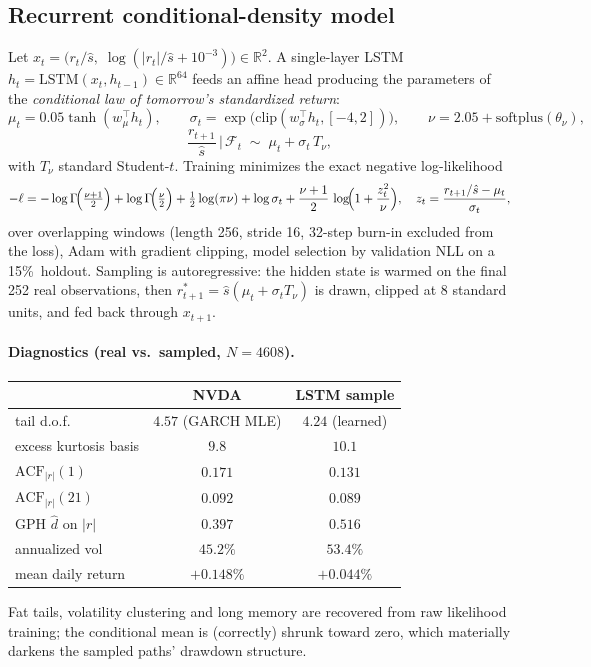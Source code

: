 \documentclass[11pt,a4paper]{article}
\newcommand{\R}{\mathbb{R}}
\begin{document}
\subsection{Recurrent conditional-density model}\label{sec:rnn}

Let $x_t = \bigl(r_t/\hat s,\; \log(|r_t|/\hat s + 10^{-3})\bigr)\in\R^2$. A
single-layer LSTM $h_t = \mathrm{LSTM}(x_t, h_{t-1})\in\R^{64}$ feeds an affine
head producing the parameters of the \emph{conditional law of tomorrow's
standardized return}:
\begin{equation}
\mu_t = 0.05\tanh(w_\mu^\top h_t),\qquad
\sigma_t = \exp\bigl(\mathrm{clip}(w_\sigma^\top h_t, [-4,2])\bigr),\qquad
\nu = 2.05 + \mathrm{softplus}(\theta_\nu),
\end{equation}
\begin{equation}
\frac{r_{t+1}}{\hat s}\,\Big|\, \mathcal F_t \;\sim\; \mu_t + \sigma_t\, T_\nu ,
\end{equation}
with $T_\nu$ standard Student-$t$. Training minimizes the exact negative
log-likelihood
\begin{equation}
-\ell = -\log\Gamma\!\Bigl(\tfrac{\nu+1}{2}\Bigr) + \log\Gamma\!\Bigl(\tfrac{\nu}{2}\Bigr)
+ \tfrac12\log(\pi\nu) + \log\sigma_t
+ \frac{\nu+1}{2}\,\log\!\Bigl(1+\frac{z_t^2}{\nu}\Bigr),
\quad z_t = \frac{r_{t+1}/\hat s - \mu_t}{\sigma_t},
\end{equation}
over overlapping windows (length 256, stride 16, 32-step burn-in excluded from
the loss), Adam with gradient clipping, model selection by validation NLL on a
15\%\ holdout. Sampling is autoregressive: the hidden state is warmed on the
final 252 real observations, then $r^\ast_{t+1} = \hat s(\mu_t + \sigma_t
T_\nu)$ is drawn, clipped at $8$ standard units, and fed back through $x_{t+1}$.

\paragraph{Diagnostics (real vs.\ sampled, $N=4608$).}
\begin{center}
\begin{tabular}{lcc}
\toprule
 & NVDA & LSTM sample\\
\midrule
tail d.o.f. & $4.57$ (GARCH MLE) & $4.24$ (learned)\\
excess kurtosis basis & $9.8$ & $10.1$\\
$\mathrm{ACF}_{|r|}(1)$ & $0.171$ & $0.131$\\
$\mathrm{ACF}_{|r|}(21)$ & $0.092$ & $0.089$\\
GPH $\hat d$ on $|r|$ & $0.397$ & $0.516$\\
annualized vol & $45.2\%$ & $53.4\%$\\
mean daily return & $+0.148\%$ & $+0.044\%$\\
\bottomrule
\end{tabular}
\end{center}
Fat tails, volatility clustering and long memory are recovered from raw
likelihood training; the conditional mean is (correctly) shrunk toward zero,
which materially darkens the sampled paths' drawdown structure.
\end{document}
